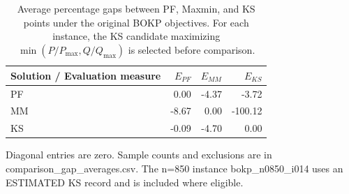 \begin{table}[t]
\centering
\caption{Average percentage gaps between PF, Maxmin, and KS points under the original BOKP objectives. For each instance, the KS candidate maximizing $\min(P/P_{\max},Q/Q_{\max})$ is selected before comparison.}
\label{tab:pf_maxmin_ks_gaps}
\begin{tabular}{lrrr}
\hline
Solution / Evaluation measure & $E_{PF}$ & $E_{MM}$ & $E_{KS}$ \\
\hline
PF & 0.00 & -4.37 & -3.72 \\
MM & -8.67 & 0.00 & -100.12 \\
KS & -0.09 & -4.70 & 0.00 \\
\hline
\end{tabular}
\begin{flushleft}
\footnotesize{Diagonal entries are zero. Sample counts and exclusions are in comparison\_gap\_averages.csv. The n=850 instance bokp\_n0850\_i014 uses an ESTIMATED KS record and is included where eligible.}
\end{flushleft}
\end{table}
